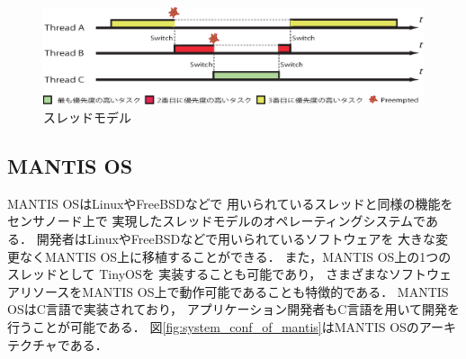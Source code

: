 \begin{figure}[htbp]
 \begin{center}
  \includegraphics[width=140mm]{./images/threads_model.eps}
 \end{center}
 \caption{スレッドモデル}
 \label{fig:threads_model}
\end{figure}



\subsection{MANTIS OS}
MANTIS OS\cite{Bhatti:2005:MOE:1160162.1160178}はLinuxやFreeBSDなどで
用いられているスレッドと同様の機能をセンサノード上で
実現したスレッドモデルのオペレーティングシステムである．
開発者はLinuxやFreeBSDなどで用いられているソフトウェアを
大きな変更なくMANTIS OS上に移植することができる．
また，MANTIS OS上の1つのスレッドとして
TinyOS\cite{Hill:2000:SAD:356989.356998}\cite{Levis04tinyos:an}を
実装することも可能であり\cite{Trumpler06asystematic}，
さまざまなソフトウェアリソースをMANTIS OS上で動作可能であることも特徴的である．
MANTIS OSはC言語で実装されており，
アプリケーション開発者もC言語を用いて開発を行うことが可能である．
図\ref{fig:system_conf_of_mantis}はMANTIS OSのアーキテクチャである．


